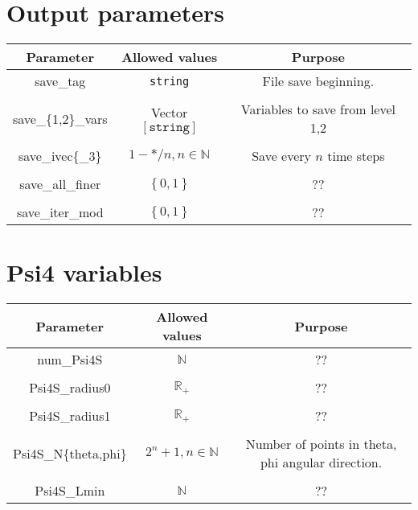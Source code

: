 \documentclass{article}
\begin{document}
\section*{Output parameters}
\begin{table}[h]
   \centering 
   \begin{tabular}{ccc}
      Parameter  & Allowed values & Purpose \\
      \midrule\midrule
      save\_tag 
      &
      \texttt{string}
      &
      File save beginning.
      \\ \\
      save\_\{1,2\}\_vars &
      Vector $\left[\mathtt{string}\right]$
      &
      Variables to save from level 1,2
      \\ \\
      save\_ivec\{\_3\} 
      &
      $1-*/n,n\in\mathbb{N}$
      &
      Save every $n$ time steps
      \\ \\
      save\_all\_finer 
      &
      $\left\{0,1\right\}$
      &
      ??
      \\ \\
      save\_iter\_mod 
      &
      $\left\{0,1\right\}$
      &
      ??
   \end{tabular}
\end{table}

\newpage
\section*{Psi4 variables}
\begin{table}[h]
   \centering 
   \begin{tabular}{ccc}
      Parameter  & Allowed values & Purpose \\
      \midrule\midrule
      num\_Psi4S 
      &
      $\mathbb{N}$
      &
      ??
      \\ \\
      Psi4S\_radius0 
      &
      $\mathbb{R}_+$
      &
      ??
      \\ \\
      Psi4S\_radius1 
      &
      $\mathbb{R}_+$
      &
      ??
      \\ \\
      Psi4S\_N\{theta,phi\}
      &
      $2^n+1,n\in\mathbb{N}$
      &
      Number of points in theta, phi angular direction. 
      \\ \\
      Psi4S\_Lmin 
      &
      $\mathbb{N}$
      &
      ??
   \end{tabular}
\end{table}
\end{document}
